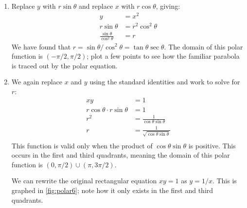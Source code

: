 {\begin{enumerate}
	\item Replace $y$ with $r\sin\theta$ and replace $x$ with $r\cos\theta$, giving:
	\begin{align*}
	y &=x^2\\
	r\sin\theta &= r^2\cos^2\theta\\
	\frac{\sin\theta}{\cos^2\theta} &= r
	\end{align*}
	We have found that $r=\sin\theta/\cos^2\theta = \tan\theta\sec\theta$. The domain of this polar function is $(-\pi/2,\pi/2)$; plot a few points to see how the familiar parabola is traced out by the polar equation.
	
	\item		We again replace $x$ and $y$ using the standard identities and work to solve for $r$:
	\begin{align*}
	xy &= 1 \\
	r\cos\theta\cdot r\sin\theta & = 1\\
	r^2 & = \frac{1}{\cos\theta\sin\theta}\\
	r & = \frac{1}{\sqrt{\cos\theta\sin\theta}}\\
	\end{align*}
%
%
	This function is valid only when the product of $\cos\theta\sin\theta$ is positive. This occurs in the first and third quadrants, meaning the domain of this polar function is $(0,\pi/2) \cup (\pi,3\pi/2)$.
	
	We can rewrite the original rectangular equation $xy=1$ as $y=1/x$. This is graphed in \autoref{fig:polar6}; note how it only exists in the first and third quadrants.
		

\end{enumerate}}
